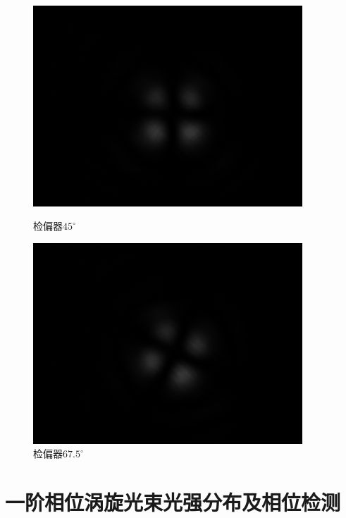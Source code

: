 \documentclass[a4paper,UTF8]{ctexart}
\begin{document}
\begin{figure}[H]
    \centering
    \begin{minipage}[b]{0.45\textwidth}
        \centering
        \includegraphics[width=0.9\textwidth]{./fig/2_3.png}
        \caption{检偏器$45^{\circ}$}
    \end{minipage}
    \begin{minipage}[b]{0.45\textwidth}
        \centering
        \includegraphics[width=0.9\textwidth]{./fig/2_2.png}
        \caption{检偏器$67.5^{\circ}$}
    \end{minipage}
\end{figure}

\section{一阶相位涡旋光束光强分布及相位检测}
\end{document}
